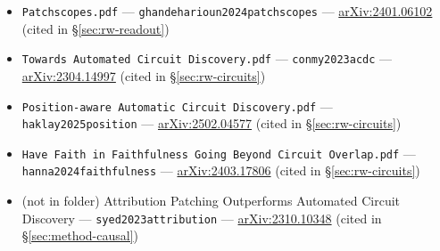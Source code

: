 \begin{itemize}
  --- \texttt{zhang2024bestpractices} ---
  \href{https://arxiv.org/abs/2309.16042}{arXiv:2309.16042} (cited in \S\ref{sec:rw-patching})
\item \texttt{Patchscopes.pdf}
  --- \texttt{ghandeharioun2024patchscopes} ---
  \href{https://arxiv.org/abs/2401.06102}{arXiv:2401.06102} (cited in \S\ref{sec:rw-readout})
\item \texttt{Towards Automated Circuit Discovery.pdf}
  --- \texttt{conmy2023acdc} ---
  \href{https://arxiv.org/abs/2304.14997}{arXiv:2304.14997} (cited in \S\ref{sec:rw-circuits})
\item \texttt{Position-aware Automatic Circuit Discovery.pdf}
  --- \texttt{haklay2025position} ---
  \href{https://arxiv.org/abs/2502.04577}{arXiv:2502.04577} (cited in \S\ref{sec:rw-circuits})
\item \texttt{Have Faith in Faithfulness Going Beyond Circuit Overlap.pdf}
  --- \texttt{hanna2024faithfulness} ---
  \href{https://arxiv.org/abs/2403.17806}{arXiv:2403.17806} (cited in \S\ref{sec:rw-circuits})
\item (not in folder) Attribution Patching Outperforms Automated Circuit Discovery
  --- \texttt{syed2023attribution} ---
  \href{https://arxiv.org/abs/2310.10348}{arXiv:2310.10348} (cited in \S\ref{sec:method-causal})
\end{itemize}
